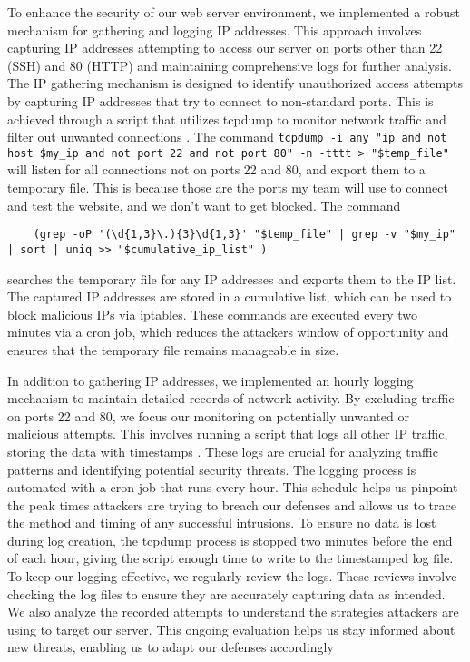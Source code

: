 To enhance the security of our web server environment, we implemented a robust mechanism for gathering and logging IP addresses. This approach involves capturing IP addresses attempting 
to access our server on ports other than 22 (SSH) and 80 (HTTP) and maintaining comprehensive logs for further analysis. The IP gathering mechanism is designed to identify unauthorized access 
attempts by capturing IP addresses that try to connect to non-standard ports. This is achieved through a script that utilizes tcpdump to monitor network traffic and filter out unwanted connections \cite{TechTarget_Net}. 
The command \verb+tcpdump -i any "ip and not host $my_ip and not port 22 and not port 80" -n -tttt > "$temp_file"+ will listen for all connections not on ports 22 and 80, and export them to a temporary file. This is because those are the ports my team will use to connect and test the website, and we don't want to get blocked.   
The command \begin{verbatim}
    (grep -oP '(\d{1,3}\.){3}\d{1,3}' "$temp_file" | grep -v "$my_ip" | sort | uniq >> "$cumulative_ip_list" )
    \end{verbatim}
searches the temporary file for any IP addresses and exports them to the IP list.   
The captured IP addresses are stored in a cumulative list, which can be used to block malicious IPs via iptables. These commands are executed every two minutes via a cron job, which reduces the attackers window of opportunity and ensures that the temporary file remains manageable in size.

In addition to gathering IP addresses, we implemented an hourly logging mechanism to maintain detailed records of network activity. By excluding traffic on ports 22 and 80, we focus our monitoring on potentially unwanted or malicious attempts.
This involves running a script that logs all other IP traffic, storing the data with timestamps \cite{Schwartz_TCPDUMP}. These logs are crucial for analyzing traffic patterns and identifying potential security threats. 
The logging process is automated with a cron job that runs every hour. This schedule helps us pinpoint the peak times attackers are trying to breach our defenses and allows us to trace the method and timing of any successful intrusions.
To ensure no data is lost during log creation, the tcpdump process is stopped two minutes before the end of each hour, giving the script enough time to write to the timestamped log file.
To keep our logging effective, we regularly review the logs. These reviews involve checking the log files to ensure they are accurately capturing data as intended. We also analyze the recorded attempts to understand the strategies attackers are using to target our server. 
This ongoing evaluation helps us stay informed about new threats, enabling us to adapt our defenses accordingly

